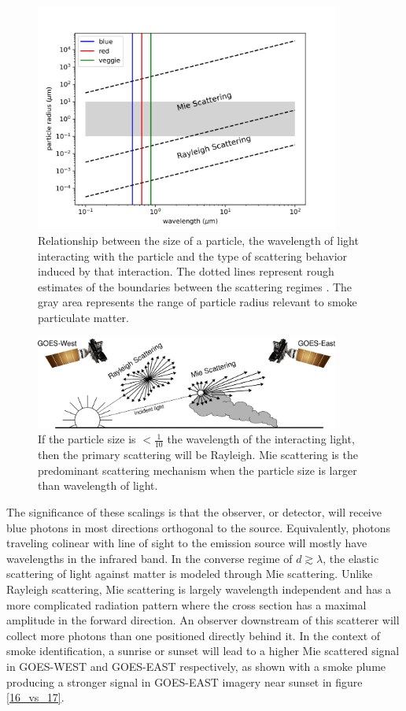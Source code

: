 \documentclass{ametsocV6.1}
\begin{document}
\begin{figure}
    \centering
    \includegraphics[width=10cm]{figures/scatter_regime.png}
    \caption{Relationship between the size of a particle, the wavelength of light interacting with the particle and the type of scattering behavior induced by that interaction. The dotted lines represent rough estimates of the boundaries between the scattering regimes \citep{petty}. The gray area represents the range of particle radius relevant to smoke particulate matter.}\label{regime}
\end{figure}

\begin{figure}
    \centering
    \includegraphics[width=10cm]{figures/mei.png}
    \caption{If the particle size is $<\frac{1}{10}$ the wavelength of the interacting light, then the primary scattering will be Rayleigh. Mie scattering is the predominant scattering mechanism when the particle size is larger than wavelength of light.} \label{mei}
\end{figure}

The significance of these scalings is that the observer, or detector, will receive blue photons in most directions orthogonal to the source. Equivalently, photons traveling colinear with line of sight to the emission source will mostly have wavelengths in the infrared band. In the converse regime of $d \gtrsim \lambda$, the elastic scattering of light against matter is modeled through Mie scattering. Unlike Rayleigh scattering, Mie scattering is largely wavelength independent and has a more complicated radiation pattern where the cross section has a maximal amplitude in the forward direction. An observer downstream of this scatterer will collect more photons than one positioned directly behind it. In the context of smoke identification, a sunrise or sunset will lead to a higher Mie scattered signal in GOES-WEST and GOES-EAST respectively, as shown with a smoke plume producing a stronger signal in GOES-EAST imagery near sunset in figure \ref{16_vs_17}.
\end{document}
